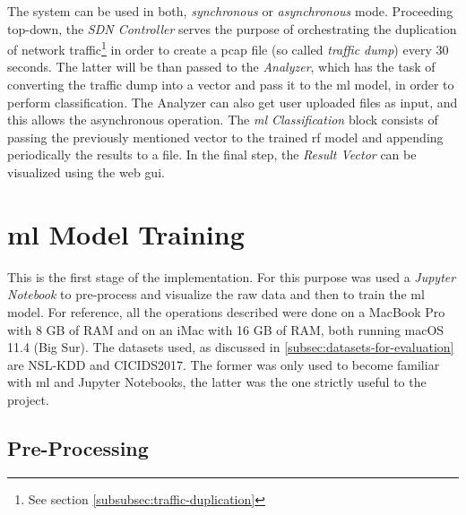 \noindent The system can be used in both, \textit{synchronous} or \textit{asynchronous} mode. Proceeding top-down, the \textit{SDN Controller} serves the purpose of orchestrating the duplication of network traffic\footnote{See section \ref{subsubsec:traffic-duplication}} in order to create a \gls{pcap} file (so called \textit{traffic dump}) every 30 seconds. The latter will be than passed to the \textit{Analyzer}, which has the task of converting the traffic dump into a vector and pass it to the \gls{ml} model, in order to perform classification. The Analyzer can also get user uploaded files as input, and this allows the asynchronous operation. The \textit{\gls{ml} Classification} block consists of passing the previously mentioned vector to the trained \gls{rf} model and appending periodically the results to a  file. In the final step, the \textit{Result Vector} can be visualized using the web \gls{gui}.


\section{\gls{ml} Model Training}
\label{sec:model-training}

This is the first stage of the implementation. For this purpose was used a \textit{Jupyter Notebook} to pre-process and visualize the raw data and then to train the \gls{ml} model. For reference, all the operations described were done on a MacBook Pro with 8 GB of RAM and on an iMac with 16 GB of RAM, both running macOS 11.4 (Big Sur). The datasets used, as discussed in \ref{subsec:datasets-for-evaluation} are NSL-KDD and CICIDS2017. The former was only used to become familiar with \gls{ml} and Jupyter Notebooks, the latter was the one strictly useful to the project.


\subsection{Pre-Processing}
\label{subsec:pre-processing}

\textcolor{dimgray}{\lipsum[1]}


